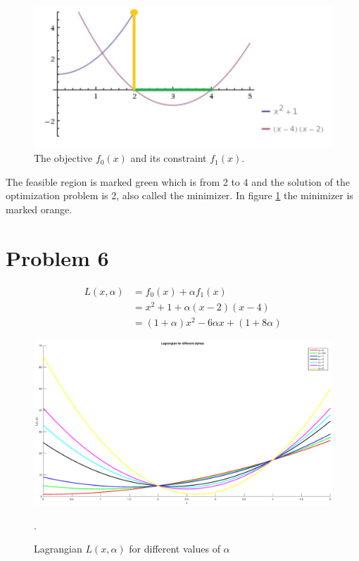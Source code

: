 \documentclass[12pt]{article}
\begin{document}
\begin{figure}[ht]
\includegraphics[width=\textwidth]{ex5.jpg}
\caption{The objective $f_0(x)$ and its constraint $f_1(x)$.}
\label{optimizationprob}
\end{figure}

The feasible region is marked green which is from 2 to 4 and the solution of the optimization problem is 2, also called the minimizer. In figure \ref{optimizationprob} the minimizer is marked orange.

\section*{Problem 6}

\begin{equation}
 \begin{align}
  L(x, \alpha) &= f_0(x) + \alpha f_1(x) \\
    &= x^2 + 1 + \alpha (x-2)(x-4) \\
    &= (1 + \alpha) x^2 - 6 \alpha x + (1 + 8 \alpha)
 \end{align}
\end{equation}



\begin{figure}[!ht] 
 \center
 \includegraphics[width=\textwidth]{prob6}
 \caption{Lagrangian $L(x, \alpha)$ for different values of $\alpha$}.
 \label{figprob6}
\end{figure}
\end{document}
